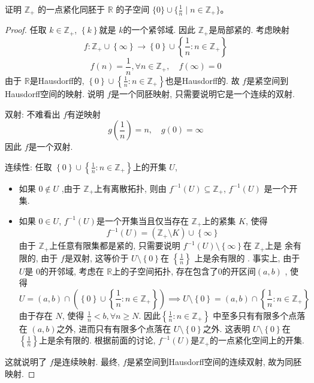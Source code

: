 \documentclass[../main.tex]{subfiles}
\begin{document}
\begin{exercise}{}{}
证明 $\mathbb{Z}_+$ 的一点紧化同胚于 $\mathbb{R}$ 的子空间 $\{0\} \cup \{\frac{1}{n} \mid n \in \mathbb{Z}_+\}$。
\end{exercise}
\begin{proof}
    任取 \(  k \in \mathbb{Z} _{+ }  \), \(  \left\{ k \right\}  \)就是 \(  k  \)的一个紧邻域. 因此 \(  \mathbb{Z} _{+ }  \)是局部紧的.    考虑映射 \[
    f:\mathbb{Z} _{+ }\cup \left\{ \infty \right\}\to \left\{ 0 \right\}\cup \left\{ \frac{1 }{n }: n\in \mathbb{Z} _{+ }  \right\}
    \] \[
    f\left( n \right)= \frac{1 }{n }, \forall n\in \mathbb{Z} _{+ },\quad f\left( \infty \right)=    0
    \]由于 \(  \mathbb{R}   \)是Hausdorff的,  \(  \left\{ 0 \right\}\cup \left\{ \frac{1 }{n }:n\in \mathbb{Z} _{+ }  \right\}  \)也是Hausdorff的.   故 \(  f  \)是紧空间到Hausdorff空间的映射. 说明 \(  f  \)是一个同胚映射, 只需要说明它是一个连续的双射. 
    
    双射: 不难看出 \(  f  \)有逆映射 \[
    g\left( \frac{1 }{n }  \right)= n, \quad g\left( 0 \right)= \infty  
    \]因此 \(  f  \)是一个双射. 
    
    连续性: 任取 \(  \left\{ 0 \right\}\cup \left\{ \frac{1 }{n }: n\in \mathbb{Z} _{+ }  \right\}  \)上的开集 \(  U  \),
    \begin{itemize}
        \item 如果 \(  0\not \in U  \) ,由于 \(  \mathbb{Z} _{+ }  \)上有离散拓扑, 则由 \(  f^{-1} \left( U \right)\subseteq \mathbb{Z} _{+ }   \), \(  f^{-1} \left( U \right)   \) 是一个开集.
        \item   如果 \(  0 \in U  \),  \(  f^{-1} \left( U \right)   \)是一个开集当且仅当存在 \(  \mathbb{Z} _{+ }  \)上的紧集 \(  K  \), 使得 \[
    f^{-1} \left( U \right)= \left( \mathbb{Z} _{+ }\setminus K \right) \cup \left\{ \infty \right\} 
    \]   由于 \(  \mathbb{Z} _{+ }  \)上任意有限集都是紧的, 只需要说明 \(  f^{-1} \left( U \right)  \setminus \left\{ \infty \right\} \)在 \(  \mathbb{Z} _{+ }  \)上是 余有限的, 由于 \(  f  \)是双射, 这等价于 \(  U\setminus\left\{ 0 \right\}  \)在 \( \left\{ \frac{1 }{n }  \right\}  \) 上是余有限的  . 事实上, 由于 \(  U  \)是 \(  0  \)的开邻域, 考虑在 \(  \mathbb{R}   \)上的子空间拓扑,  存在包含了\(  0  \)的开区间\(  \left( a,b \right)   \) , 使得 \[
    U= \left( a,b \right)\cap \left( \left\{ 0 \right\}\cup \left\{ \frac{1 }{n }  : n\in \mathbb{Z} _{+ }\right\} \right)  \implies U\setminus \left\{ 0 \right\}= \left( a,b \right)\cap \left\{ \frac{1 }{n }:n\in \mathbb{Z} _{+ }  \right\} 
    \]     由于存在 \(  N  \), 使得 \(  \frac{1 }{n }< b, \forall n\ge N   \). 因此\(  \left\{ \frac{1 }{n }:n\in \mathbb{Z} _{+ }  \right\}  \)   中至多只有有限多个点落在 \(  \left( a,b \right)   \)之外, 进而只有有限多个点落在 \(  U \setminus \left\{ 0 \right\} \)之外. 这表明 \(U\setminus \left\{ 0 \right\}    \)在 \(  \left\{ \frac{1 }{n }  \right\}  \)上是余有限的. 根据前面的讨论,  \(  f^{-1} \left( U \right)   \)是\(  \mathbb{Z} _{+ }  \)的一点紧化空间上的开集. 
    \end{itemize}
   这就说明了 \(  f  \)是连续映射.       最终,  \(  f  \)是紧空间到Hausdorff空间的连续双射, 故为同胚映射. 
\end{proof}
\end{document}
